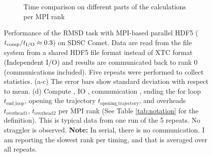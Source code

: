 \begin{figure}[ht!]
\begin{subfigure} {.5\textwidth}
  \caption{Time comparison on different parts of the calculations per MPI rank}
  \label{fig:MPIranks-hdf5}
\end{subfigure}
%
\caption{Performance of the RMSD task with MPI-based parallel HDF5 (${t}_{\text{comp}}/{t}_{\text{I/O}} \approx 0.3$) on SDSC Comet.
Data are read from the file system from a shared HDF5 file format instead of XTC format (Independent I/O) and results are communicated back to rank 0 (communications included). 
Five repeats were performed to collect statistics. (a-c) The error bars show standard deviation with respect to mean. (d) Compute \tcomp, IO \tIO, communication \tcomm, ending the for loop $t_{\text{end\_loop}}$,
  opening the trajectory $t_{\text{opening\_trajectory}}$, and overheads $t_{\text{overhead1}}$, $t_{\text{overhead2}}$ per MPI rank (See Table \ref{tab:notation} for the definition).
  This is typical data from one run of the 5 repeats. No straggler is observed. \textbf{Note:} In serial, there is no communication. I am reporting the slowest rank per timing, and that is averaged over all repeats.}
\label{fig:MPIwithIO-hdf5}
\end{figure}
